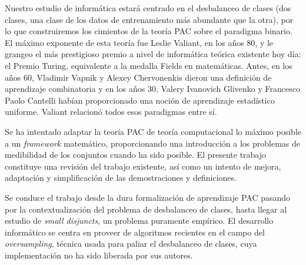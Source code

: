  Nuestro estudio de informática estará centrado en el desbalanceo de clases (dos clases, una clase de los datos de entrenamiento más 
 abundante que la otra), por lo que construiremos los cimientos de la teoría PAC sobre el paradigma binario. El máximo exponente
 de esta teoría fue Leslie Valiant, en los años 80, y le grangeo el más prestigioso premio a nivel de informática teórica
 existente hoy día: el Premio Turing, equivalente a la medalla Fields en matemáticas. Antes, en los años 60, Vladimir Vapnik y 
 Alexey Chervonenkis dieron una definición de aprendizaje combinatoria y en los años 30, Valery Ivanovich Glivenko y Francesco
 Paolo Cantelli habían proporcionado una noción de aprendizaje estadístico uniforme. Valiant relacionó todos esos paradigmas
 entre sí.
 
 Se ha intentado adaptar la teoría PAC de teoría computacional lo máximo posible a un \textit{framework} matemático, proporcionando
 una introducción a los problemas de medibilidad de los conjuntos cuando ha sido posible. El presente trabajo constituye una
 revisión del trabajo existente, así como un intento de mejora, adaptación y simplificación de las demostraciones y definiciones.
 
 Se conduce el trabajo desde la dura formalización de aprendizaje PAC pasando por la contextualización del problema de 
 desbalanceo de clases, hasta llegar al estudio de \textit{small disjuncts}, un problema puramente empírico. El desarrollo
 informático se centra en proveer de algoritmos recientes en el campo del \textit{oversampling}, técnica usada para paliar
 el desbalanceo de clases, cuya implementación no ha sido liberada por sus autores.
 
